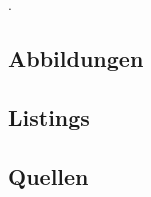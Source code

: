 \documentclass[12pt]{article}
\begin{document}
{\small\color{white}.}
\vspace{-2cm}
\subsection{Abbildungen}
\label{subsec:abbildungen}
\begingroup
\renewcommand{\section}[2]{}
\listoffigures
\endgroup

\subsection{Listings}
\label{subsec:listings}
\begingroup
\renewcommand{\section}[2]{}
\lstlistoflistings
\endgroup

\subsection{Quellen}
\label{subsec:quellen}
\begingroup
\renewcommand{\section}[2]{}


\endgroup
\end{document}
